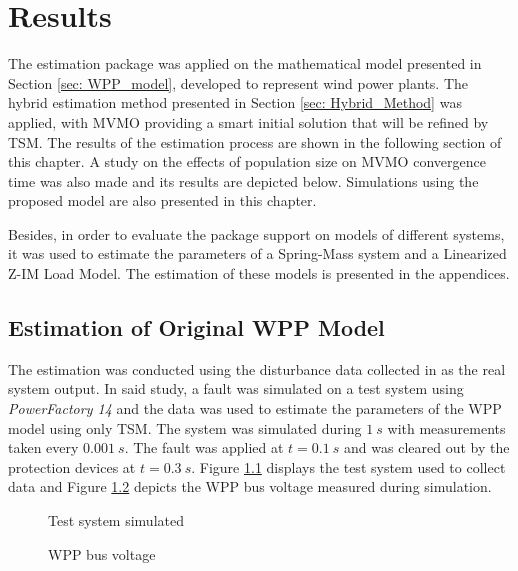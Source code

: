 \chapter{Results}
\label{ch: Results}

The estimation package was applied on the mathematical model presented in Section \ref{sec: WPP_model}, developed to represent wind power plants. The hybrid estimation method presented in Section \ref{sec: Hybrid_Method} was applied, with MVMO providing a smart initial solution that will be refined by TSM. The results of the estimation process are shown in the following section of this chapter. A study on the effects of population size on MVMO convergence time was also made and its results are depicted below. Simulations using the proposed model are also presented in this chapter.

Besides, in order to evaluate the package support on models of different systems, it was used to estimate the parameters of a Spring-Mass system and a Linearized Z-IM Load Model. The estimation of these models is presented in the appendices.

\section{Estimation of Original WPP Model}

The estimation was conducted using the disturbance data collected in \cite{Cari2015} as the real system output. In said study, a fault was simulated on a test system using \textit{PowerFactory 14} and the data was used to estimate the parameters of the WPP model using only TSM. The system was simulated during $1\ s$ with measurements taken every $0.001\ s$. The fault was applied at $t=0.1\ s$ and was cleared out by the protection devices at $t=0.3\ s$. Figure \ref{fig: test_system} displays the test system used to collect data and Figure \ref{fig: WPP_voltage} depicts the WPP bus voltage measured during simulation.

\begin{figure}[h]
	\caption{Test system simulated}
	\begin{center}
	\end{center}
	\label{fig: test_system}
\end{figure}

\begin{figure}[h]
	\caption{WPP bus voltage}
	\begin{center}
	\end{center}
	\label{fig: WPP_voltage}
\end{figure}

